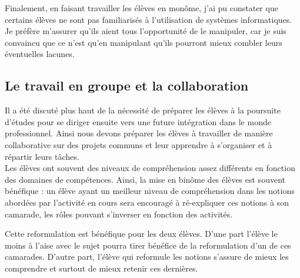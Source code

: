 \documentclass[pdftex,a4paper,12pt]{article}
\begin{document}
	Finalement, en faisant travailler les élèves en monôme, j'ai pu constater que certains élèves ne sont pas familiarisés à l'utilisation de systèmes informatiques.
	Je préfère m'assurer qu'ils aient tous l'opportunité de le manipuler, 
	car je suis convaincu que ce n'est qu'en manipulant qu'ils pourront mieux combler leurs éventuelles lacunes.

	\subsection{Le travail en groupe et la collaboration}
	Il a été discuté plus haut de la nécessité de préparer les élèves à la poursuite d'études 
	pour se diriger ensuite vers une future intégration dans le monde professionnel.
	Ainsi nous devons préparer les élèves à travailler de manière collaborative sur des projets communs et leur apprendre à s'organiser et à répartir leurs tâches.\\

	Les élèves ont souvent des niveaux de compréhension assez différents en fonction des domaines de compétences.
	Ainsi, la mise en binôme des élèves est souvent bénéfique : 
	un élève ayant un meilleur niveau de compréhension dans les notions abordées par l'activité en cours sera encouragé à ré-expliquer ces notions à son camarade,
	les rôles pouvant s'inverser en fonction des activités.

	Cette reformulation est bénéfique pour les deux élèves.
	D'une part l'élève le moins à l'aise avec le sujet pourra tirer bénéfice de la reformulation d'un de ces camarades.
	D'autre part, l'élève qui reformule les notions s'assure de mieux les comprendre et surtout de mieux retenir ces dernières.
\end{document}
